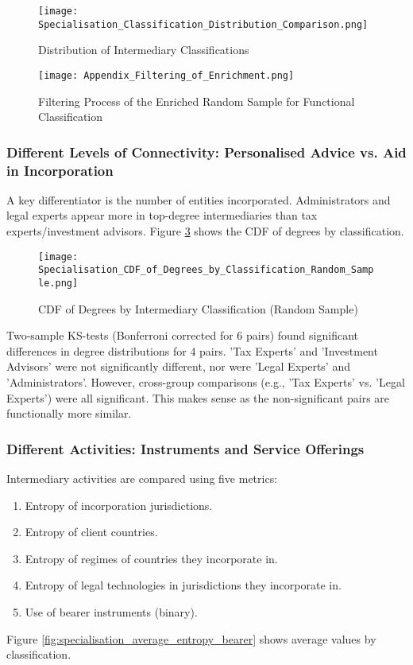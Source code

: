 \begin{figure}[htbp]
    \centering
    \texttt{[image: Specialisation\_Classification\_Distribution\_Comparison.png]}
    \caption{Distribution of Intermediary Classifications}
    \label{fig:specialisation_classification_distribution}
\end{figure}

\begin{figure}[htbp]
    \centering
    \texttt{[image: Appendix\_Filtering\_of\_Enrichment.png]}
    \caption{Filtering Process of the Enriched Random Sample for Functional Classification}
    \label{fig:appendix_filtering_enrichment}
\end{figure}

\subsubsection{Different Levels of Connectivity: Personalised Advice vs. Aid in Incorporation}
A key differentiator is the number of entities incorporated. Administrators and legal experts appear more in top-degree intermediaries than tax experts/investment advisors. Figure \ref{fig:specialisation_cdf_degrees} shows the CDF of degrees by classification.

\begin{figure}[htbp]
    \centering
    \texttt{[image: Specialisation\_CDF\_of\_Degrees\_by\_Classification\_Random\_Sample.png]}
    \caption{CDF of Degrees by Intermediary Classification (Random Sample)}
    \label{fig:specialisation_cdf_degrees}
\end{figure}

Two-sample KS-tests (Bonferroni corrected for 6 pairs) found significant differences in degree distributions for 4 pairs. 'Tax Experts' and 'Investment Advisors' were not significantly different, nor were 'Legal Experts' and 'Administrators'. However, cross-group comparisons (e.g., 'Tax Experts' vs. 'Legal Experts') were all significant. This makes sense as the non-significant pairs are functionally more similar.

\subsubsection{Different Activities: Instruments and Service Offerings}
Intermediary activities are compared using five metrics:
\begin{enumerate}
    \item Entropy of incorporation jurisdictions.
    \item Entropy of client countries.
    \item Entropy of regimes of countries they incorporate in.
    \item Entropy of legal technologies in jurisdictions they incorporate in.
    \item Use of bearer instruments (binary).
\end{enumerate}
Figure \ref{fig:specialisation_average_entropy_bearer} shows average values by classification.

